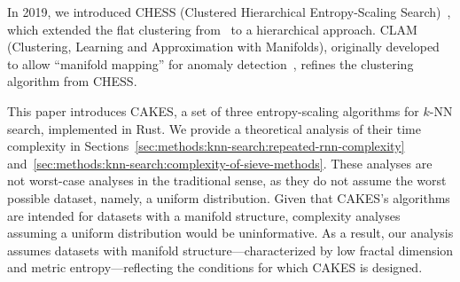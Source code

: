 In 2019, we introduced CHESS (Clustered Hierarchical Entropy-Scaling Search)~\cite{ishaq2019clustered}, which extended the flat clustering from~\cite{yu2015entropy} to a hierarchical approach.
CLAM (Clustering, Learning and Approximation with Manifolds), originally developed to allow ``manifold mapping'' for anomaly detection~\cite{ishaq2021clustered}, refines the clustering algorithm from CHESS.

This paper introduces CAKES, a set of three entropy-scaling algorithms for $k$-NN search, implemented in Rust.
We provide a theoretical analysis of their time complexity in Sections~\ref{sec:methods:knn-search:repeated-rnn-complexity} and~\ref{sec:methods:knn-search:complexity-of-sieve-methods}.
These analyses are not worst-case analyses in the traditional sense, as they do not assume the worst possible dataset, namely, a uniform distribution.
Given that CAKES's algorithms are intended for datasets with a manifold structure, complexity analyses assuming a uniform distribution would be uninformative.
As a result, our analysis assumes datasets with manifold structure—characterized by low fractal dimension and metric entropy—reflecting the conditions for which CAKES is designed.
